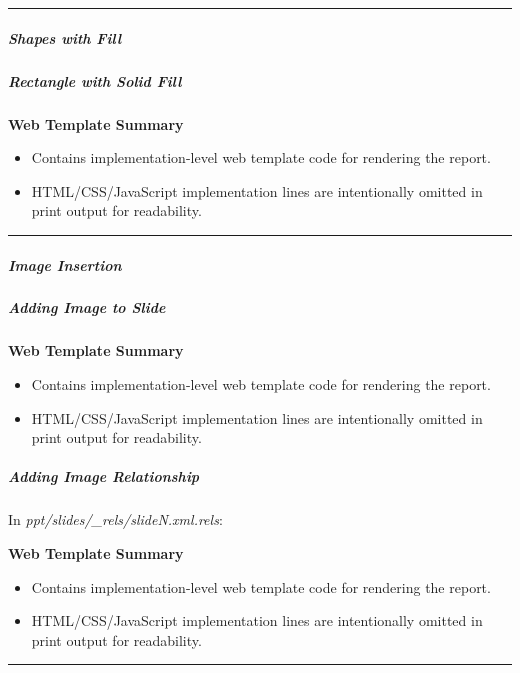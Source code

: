 \documentclass[11pt]{article}
\begin{document}
\vspace{0.5em}\hrule\vspace{0.5em}

\subparagraph{Shapes with Fill}\mbox{}\par

\subparagraph{Rectangle with Solid Fill}\mbox{}\par

\textbf{Web Template Summary}
\begin{itemize}[leftmargin=*,itemsep=2pt,topsep=2pt]
\item {} Contains implementation-level web template code for rendering the report.
\item {} HTML/CSS/JavaScript implementation lines are intentionally omitted in print output for readability.
\end{itemize}

\vspace{0.5em}\hrule\vspace{0.5em}

\subparagraph{Image Insertion}\mbox{}\par

\subparagraph{Adding Image to Slide}\mbox{}\par

\textbf{Web Template Summary}
\begin{itemize}[leftmargin=*,itemsep=2pt,topsep=2pt]
\item {} Contains implementation-level web template code for rendering the report.
\item {} HTML/CSS/JavaScript implementation lines are intentionally omitted in print output for readability.
\end{itemize}

\subparagraph{Adding Image Relationship}\mbox{}\par

In \emph{ppt/slides/\_\allowbreak{}rels/slideN.xml.rels}:


\textbf{Web Template Summary}
\begin{itemize}[leftmargin=*,itemsep=2pt,topsep=2pt]
\item {} Contains implementation-level web template code for rendering the report.
\item {} HTML/CSS/JavaScript implementation lines are intentionally omitted in print output for readability.
\end{itemize}

\vspace{0.5em}\hrule\vspace{0.5em}
\end{document}
